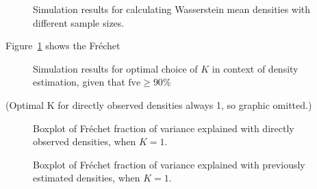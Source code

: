 \begin{figure}[h]
    \centering
    \resizebox{0.9\textwidth}{!}{}
    \caption[Simulation results: average Fréchet means]{Simulation results for calculating
    Wasserstein mean densities with different sample sizes.}
    \label{fig:sim_f_mean}
\end{figure}
Figure~\ref{fig:sim_f_mean} shows the Fréchet 
\begin{figure}[h]
    \centering
    \resizebox{0.9\textwidth}{!}{}
    \caption[Simulation results: optimal $K$]{Simulation results for optimal choice of
    $K$ in context of density estimation, given that $\text{fve} \geq 90 \%$}
    \label{fig:sim_k_opt_denstimation}
\end{figure}

(Optimal K for directly observed densities always 1, so graphic omitted.)

\begin{figure}[h]
    \centering
    \resizebox{0.9\textwidth}{!}{}
    \caption[Simulation results: boxplots fve --- observed densities]{Boxplot of
    Fréchet fraction of variance explained with directly observed
    densities, when $K = 1$.}
    \label{fig:sim_fve}
\end{figure}

\begin{figure}[h]
    \centering
    \resizebox{0.9\textwidth}{!}{}
    \caption[Simulation results: boxplots fve --- estimated densities]{Boxplot of
    Fréchet fraction of variance explained with previously estimated densities, when
    $K = 1$.}
    \label{fig:sim_fve_denstimation}
\end{figure}




















